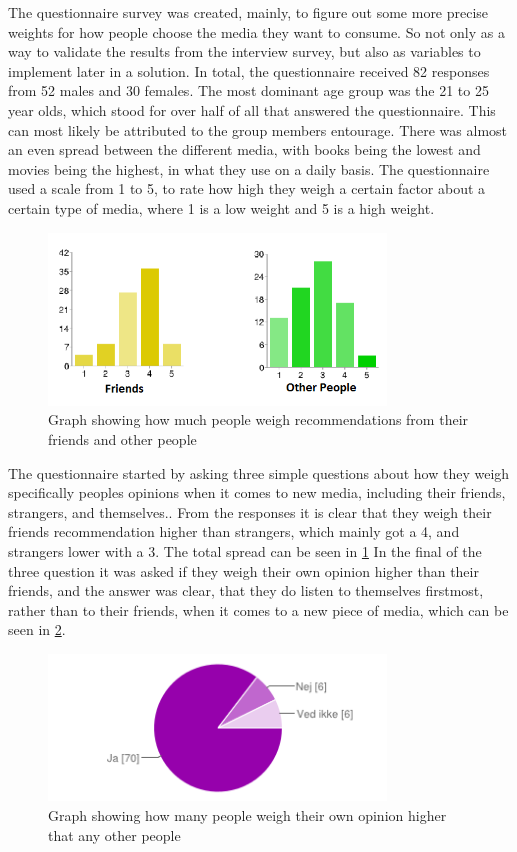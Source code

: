 The questionnaire survey was created, mainly, to figure out some more precise weights for how people choose the media they want to consume. So not only as a way to validate the results from the interview survey, but also as variables to implement later in a solution.
In total, the questionnaire received 82 responses from 52 males and 30 females. The most dominant age group was the 21 to 25 year olds, which stood for over half of all that answered the questionnaire. This can most likely be attributed to the group members entourage. There was almost an even spread between the different media, with books being the lowest and movies being the highest, in what they use on a daily basis.
The questionnaire used a scale from 1 to 5, to rate how high they weigh a certain factor about a certain type of media, where 1 is a low weight and 5 is a high weight.

\begin{figure}[htb]
\centering
\includegraphics[width=0.8\textwidth]{Images/people.png}
\caption{Graph showing how much people weigh recommendations from their friends and other people}
\label{People}
\end{figure}

The questionnaire started by asking three simple questions about how they weigh specifically peoples opinions when it comes to new media, including their friends, strangers, and themselves.. From the responses it is clear that they weigh their friends recommendation higher than strangers, which mainly got a 4, and strangers lower with a 3. The total spread can be seen in \ref{People} In the final of the three question it was asked if they weigh their own opinion higher than their friends, and the answer was clear, that they do listen to themselves firstmost, rather than to their friends, when it comes to a new piece of media, which can be seen in \ref{Own}.

\begin{figure}[htb]
\centering
\includegraphics[width=0.8\textwidth]{Images/own.png}
\caption{Graph showing how many people weigh their own opinion higher that any other people}
\label{Own}
\end{figure}

